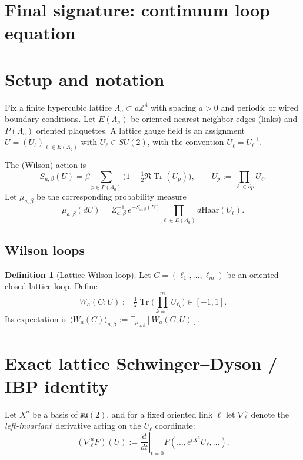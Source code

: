 \documentclass[11pt]{article}
\theoremstyle{definition}
\newtheorem{definition}[theorem]{Definition}
\newcommand{\1}{\mathbf{1}}
\newcommand{\Tr}{\operatorname{Tr}}
\begin{document}
\section{Final signature: continuum loop equation}\label{sec:loop}
\section{Setup and notation}

Fix a finite hypercubic lattice $\Lambda_a\subset a\mathbb Z^4$ with spacing $a>0$ and periodic or wired boundary conditions. Let $E(\Lambda_a)$ be oriented nearest-neighbor edges (links) and $P(\Lambda_a)$ oriented plaquettes. A lattice gauge field is an assignment $U=(U_\ell)_{\ell\in E(\Lambda_a)}$ with $U_\ell\in SU(2)$, with the convention $U_{\bar\ell}=U_\ell^{-1}$.

The (Wilson) action is
\begin{equation}
S_{a,\beta}(U)=\beta\sum_{p\in P(\Lambda_a)}\Big(1-\tfrac12\Re\Tr(U_p)\Big),\qquad U_p:=\prod_{\ell\in\partial p} U_\ell.
\end{equation}
Let $\mu_{a,\beta}$ be the corresponding probability measure
\begin{equation}
\mu_{a,\beta}(dU)=Z_{a,\beta}^{-1}\,e^{-S_{a,\beta}(U)}\prod_{\ell\in E(\Lambda_a)} d\mathrm{Haar}(U_\ell).
\end{equation}

\subsection{Wilson loops}

\begin{definition}[Lattice Wilson loop]
Let $C=(\ell_1,\dots,\ell_m)$ be an oriented closed lattice loop. Define
\begin{equation}
W_a(C;U):=\tfrac12\Tr\Big(\prod_{k=1}^m U_{\ell_k}\Big)\in[-1,1].
\end{equation}
Its expectation is $\langle W_a(C)\rangle_{a,\beta}:=\mathbb E_{\mu_{a,\beta}}[W_a(C;U)]$.
\end{definition}

\section{Exact lattice Schwinger--Dyson / IBP identity}

Let $X^a$ be a basis of $\mathfrak{su}(2)$, and for a fixed oriented link $\ell$ let $\nabla^{a}_{\ell}$ denote the \,\emph{left-invariant}\, derivative acting on the $U_\ell$ coordinate:
\begin{equation}
(\nabla^{a}_{\ell}F)(U):=\left.\frac{d}{dt}\right|_{t=0}F(\dots, e^{tX^a}U_\ell,\dots).
\end{equation}
\end{document}
